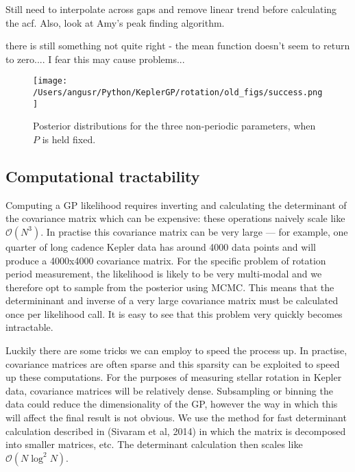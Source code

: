 \documentclass[12pt,preprint]{aastex}
\begin{document}
Still need to interpolate across gaps and remove linear trend before calculating the acf.
Also, look at Amy's peak finding algorithm.

there is still something not quite right - the mean function doesn't seem to return to zero.... I fear this may cause problems...

\begin{figure}[ht]
\begin{center}
\texttt{[image: /Users/angusr/Python/KeplerGP/rotation/old\_figs/success.png]}
\caption{Posterior distributions for the three non-periodic parameters, when $P$ is held fixed.}
\label{fig:fixed_period}
\end{center}
\end{figure}

\subsection{Computational tractability}

Computing a GP likelihood requires inverting and calculating the determinant of the covariance matrix which can be expensive:
these operations naively scale like $\mathcal{O}(N^3)$.
In practise this covariance matrix can be very large --- for example, one quarter of long cadence Kepler data has around 4000 data points and will produce a 4000x4000 covariance matrix.
For the specific problem of rotation period measurement, the likelihood is likely to be very multi-modal and we therefore opt to sample from the posterior using MCMC.
This means that the determininant and inverse of a very large covariance matrix must be calculated once per likelihood call.
It is easy to see that this problem very quickly becomes intractable.

Luckily there are some tricks we can employ to speed the process up. %
In practise, covariance matrices are often sparse and this sparsity can be exploited to speed up these computations.
For the purposes of measuring stellar rotation in Kepler data, covariance matrices will be relatively dense.
Subsampling or binning the data could reduce the dimensionality of the GP, however the way in which this will affect the final result is not obvious.
We use the method for fast determinant calculation described in (Sivaram et al, 2014) in which the matrix is decomposed into smaller matrices, etc.
The determinant calculation then scales like $\mathcal{O}(N\log^2{N})$.
\end{document}
